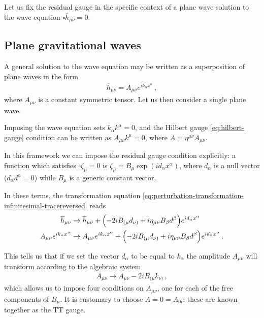 \documentclass[main.tex]{subfiles}
\begin{document}
Let us fix the residual gauge in the specific context of a plane wave solution to the wave equation \(\square \overline{h}_{\mu \nu } = 0\).

\subsection{Plane gravitational waves} \label{sec:plane-gws}

A general solution to the wave equation may be written as a superposition of plane waves in the form
%
\begin{align}
\overline{h}_{\mu \nu } = A_{\mu \nu } e^{i k_\alpha x^{\alpha }}
\,,
\end{align}
%
where \(A_{\mu \nu }\) is a constant symmetric tensor.
Let us then consider a single plane wave.

Imposing the wave equation sets \(k_{\alpha } k^{\alpha } = 0\), and the Hilbert gauge \eqref{eq:hilbert-gauge} condition can be written as \(A_{\mu \nu } k^{\mu } = 0\), where \(A = \eta^{\mu \nu } A_{\mu \nu }\). 

In this framework we can impose the residual gauge condition explicitly: a function which satisfies \(\square \zeta_{\mu } = 0\) is \(\zeta_{\mu } = B_{\mu } \exp(i d_\alpha x^{\alpha })\), where \(d_\alpha \) is a null vector (\(d_\alpha d^{\alpha } = 0\)) while \(B_\mu \) is a generic constant vector.

In these terms, the transformation equation \eqref{eq:perturbation-transformation-infinitesimal-tracereversed} reads 
%
\begin{subequations}
\begin{align}
\overline{h}_{\mu \nu } &\to \overline{h}_{\mu \nu } + \qty(- 2 i B_{(\mu } d_{\nu )}  + i \eta_{\mu \nu } B_{\beta } d^{\beta } ) e^{i d_\alpha x^{\alpha }} \\
A_{\mu \nu } e^{i k_\alpha x^{\alpha }} &\to A_{\mu \nu } e^{i k_\alpha x^{\alpha }} + \qty(-2 i B_{(\mu } d_{\nu )} + i \eta_{\mu \nu } B_{\beta } d^{\beta }) e^{i d_\alpha x^{\alpha }} 
\,.
\end{align}
\end{subequations}

This tells us that if we set the vector \(d_{\alpha }\) to be equal to \(k_\alpha \) the amplitude \(A_{\mu \nu }\) will transform according to the algebraic system
%
\begin{align}
A_{\mu \nu } \to A_{\mu \nu } - 2 i B_{(\mu } k_{\nu )}
\,,
\end{align}
%
which allows us to impose four conditions on \(A_{\mu \nu }\), one for each of the free components of \(B_{\mu }\). 
It is customary to choose \(A = 0 = A_{0 i }\): these are known together as the \ac{TT} gauge. 
\end{document}
